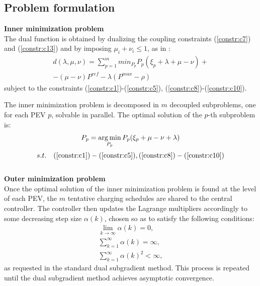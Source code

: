 \subsection{Problem formulation}
\label{sec:dec_problem}
\textbf{Inner minimization problem} \\
The dual function is obtained by dualizing the coupling constraints (\ref{constr:c7}) and (\ref{constr:c13}) and by imposing $\mu_i +\nu_i \leq 1$,  as in \autocite{10194623}:
\begin{gather*}
    d(\lambda, \mu, \nu) = \sum_{p=1}^m min_{P_p} P_p(\xi_p + \lambda +\mu - \nu) + \\
    - (\mu - \nu)P^{ref} - \lambda(P^{max} - \rho)
\end{gather*}
subject to the constraints (\ref{constr:c1})-(\ref{constr:c5}), (\ref{constr:c8})-(\ref{constr:c10}).

The inner minimization problem is decomposed in $m$ decoupled subproblems, one for each PEV $p$, solvable in parallel. The optimal solution of the $p$-th subproblem is:
\begin{gather}
    P_p = \operatorname*{arg\,min}_{P_p} P_p(\xi_p + \mu - \nu + \lambda) \label{eq:optimalPp}
\end{gather} $$s.t. \quad (\ref{constr:c1})-(\ref{constr:c5}), (\ref{constr:c8})-(\ref{constr:c10})$$ \\
\textbf{Outer minimization problem} \\
Once the optimal solution of the inner minimization problem is found at the level of each PEV, the $m$ tentative charging schedules are shared to the central controller. The controller then updates the Lagrange multipliers accordingly to some decreasing step size $\alpha(k)$, chosen so as to satisfy the following conditions:
\begin{gather*}
    \lim_{k \to \infty} \alpha(k) = 0, \\
    \sum_{k=1}^\infty \alpha(k) = \infty, \\
    \sum_{k=1}^{\infty} \alpha(k)^2 < \infty,
\end{gather*}
as requested in the standard dual subgradient method. This process is repeated until the dual subgradient method achieves asymptotic convergence.
